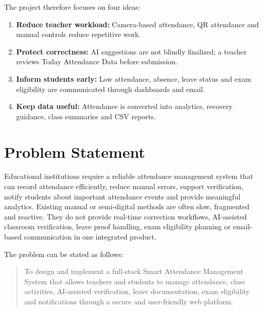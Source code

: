 The project therefore focuses on four ideas:
\begin{enumerate}[label=\arabic*.]
    \item \textbf{Reduce teacher workload:} Camera-based attendance, QR attendance and manual controls reduce repetitive work.
    \item \textbf{Protect correctness:} AI suggestions are not blindly finalized; a teacher reviews Today Attendance Data before submission.
    \item \textbf{Inform students early:} Low attendance, absence, leave status and exam eligibility are communicated through dashboards and email.
    \item \textbf{Keep data useful:} Attendance is converted into analytics, recovery guidance, class summaries and CSV reports.
\end{enumerate}

\section{Problem Statement}
Educational institutions require a reliable attendance management system that can record attendance efficiently, reduce manual errors, support verification, notify students about important attendance events and provide meaningful analytics. Existing manual or semi-digital methods are often slow, fragmented and reactive. They do not provide real-time correction workflows, AI-assisted classroom verification, leave proof handling, exam eligibility planning or email-based communication in one integrated product.

The problem can be stated as follows:

\begin{quote}
To design and implement a full-stack Smart Attendance Management System that allows teachers and students to manage attendance, class activities, AI-assisted verification, leave documentation, exam eligibility and notifications through a secure and user-friendly web platform.
\end{quote}

